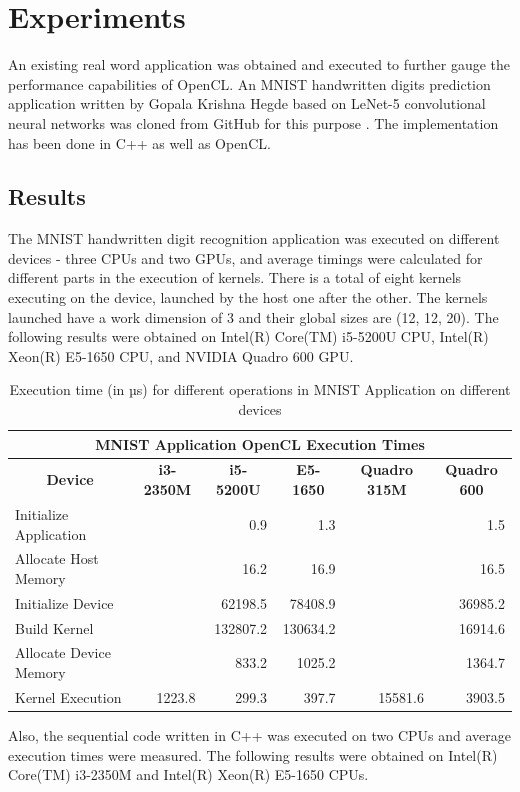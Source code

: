 \section{Experiments}
\label{sect5_3}
An existing real word application was obtained and executed to further gauge the performance capabilities of OpenCL. An MNIST handwritten digits prediction application written by Gopala Krishna Hegde based on LeNet-5 convolutional neural networks was cloned from GitHub for this purpose \cite{cnn_mnist_papaa}. The implementation has been done in C++ as well as OpenCL.

\subsection{Results}
\label{sect5_3_1}
The MNIST handwritten digit recognition application was executed on different devices - three CPUs and two GPUs, and average timings were calculated for different parts in the execution of kernels. There is a total of eight kernels executing on the device, launched by the host one after the other. The kernels launched have a work dimension of 3 and their global sizes are (12, 12, 20). \newline\newline
The following results were obtained on Intel(R) Core(TM) i5-5200U CPU, Intel(R) Xeon(R) E5-1650 CPU, and NVIDIA Quadro 600 GPU.

\begin{table}[h!]
\centering
 \caption{Execution time (in µs) for different operations in MNIST Application on different devices}
 \vspace{3mm}
 \renewcommand\arraystretch{1.6}
 \begin{tabular}{ | m{7em} | r | r | r | r | r |  }
 \hline
 \multicolumn{6}{|c|}{MNIST Application OpenCL Execution Times} \\
 \hline
 \multicolumn{1}{|c|}{\bfseries Device} & \multicolumn{1}{c|}{\bfseries i3-2350M} & \multicolumn{1}{c|}{\bfseries i5-5200U} & \multicolumn{1}{c|}{\bfseries E5-1650} & \multicolumn{1}{c|}{\bfseries Quadro 315M} & \multicolumn{1}{c|}{\bfseries Quadro 600} \\
 \hline
 Initialize Application & & 0.9 & 1.3 & & 1.5 \\
 \hline
 Allocate Host Memory & & 16.2 & 16.9 & & 16.5 \\
 \hline
 Initialize Device & & 62198.5 & 78408.9 & & 36985.2 \\ 
 \hline
 Build Kernel & & 132807.2 & 130634.2 & & 16914.6 \\
 \hline
 Allocate Device Memory & & 833.2 & 1025.2 & & 1364.7 \\
 \hline
 Kernel Execution &1223.8 & 299.3 &  397.7 & 15581.6 & 3903.5 \\
 \hline
 \end{tabular}
 \label{table:mnist_gpu}
\end{table}
Also, the sequential code written in C++ was executed on two CPUs and average execution times were measured. The following results were obtained on Intel(R) Core(TM) i3-2350M and Intel(R) Xeon(R) E5-1650 CPUs. 

